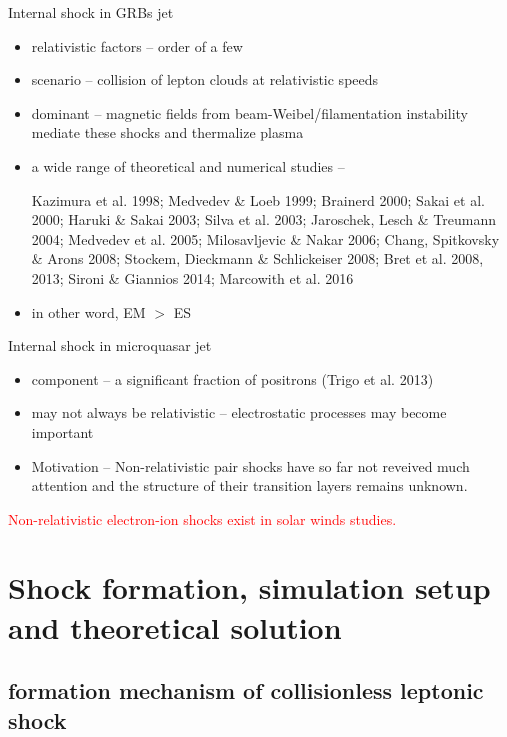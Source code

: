 \documentclass[10pt]{beamer}
\begin{document}
\begin{frame}[fragile]{Internal shock in GRBs jet}

  \begin{itemize}
  \item relativistic factors -- order of a few
  \item scenario -- collision of lepton clouds at relativistic speeds
  \item dominant -- magnetic fields from beam-Weibel/filamentation instability mediate these shocks and thermalize plasma
  \item \alert{a wide range of theoretical and numerical studies} -- 
  
  Kazimura et al. 1998; Medvedev \& Loeb 1999; Brainerd 2000; Sakai et al. 2000; Haruki \& Sakai 2003; Silva et al. 2003; Jaroschek, Lesch \& Treumann 2004; Medvedev et al. 2005; Milosavljevic \& Nakar 2006; Chang, Spitkovsky \& Arons 2008; Stockem, Dieckmann \& Schlickeiser 2008; Bret et al. 2008, 2013; Sironi \& Giannios 2014; Marcowith et al. 2016
  \item in other word, EM $>$ ES
  \end{itemize}

\end{frame}

\begin{frame}[fragile]{Internal shock in microquasar jet}
  \begin{itemize}
  \item component -- a significant fraction of positrons (Trigo et al. 2013)
  \item may not always be relativistic -- electrostatic processes may become important
  \item \alert{Motivation -- Non-relativistic pair shocks have so far not reveived much attention and the structure of their transition layers remains unknown.}
  \end{itemize}
  \textcolor{red}{Non-relativistic electron-ion shocks exist in solar winds studies.}
\end{frame}

\section{Shock formation, simulation setup and theoretical solution}

\subsection{formation mechanism of collisionless leptonic shock}
\end{document}
